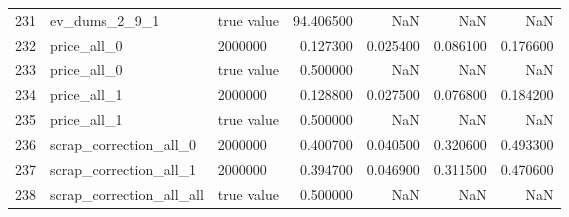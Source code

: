 \begin{tabular}{lllrrrr}
231 & ev_dums_2_9_1 & true value & 94.406500 & NaN & NaN & NaN \\
232 & price_all_0 & 2000000 & 0.127300 & 0.025400 & 0.086100 & 0.176600 \\
233 & price_all_0 & true value & 0.500000 & NaN & NaN & NaN \\
234 & price_all_1 & 2000000 & 0.128800 & 0.027500 & 0.076800 & 0.184200 \\
235 & price_all_1 & true value & 0.500000 & NaN & NaN & NaN \\
236 & scrap_correction_all_0 & 2000000 & 0.400700 & 0.040500 & 0.320600 & 0.493300 \\
237 & scrap_correction_all_1 & 2000000 & 0.394700 & 0.046900 & 0.311500 & 0.470600 \\
238 & scrap_correction_all_all & true value & 0.500000 & NaN & NaN & NaN \\
\bottomrule
\end{tabular}
